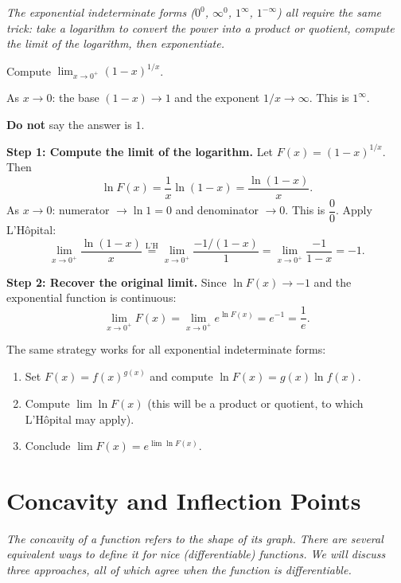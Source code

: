 \textit{The exponential indeterminate forms ($0^{0}$, $\infty^{0}$, $1^{\infty}$, $1^{-\infty}$) all require the same trick: take a logarithm to convert the power into a product or quotient, compute the limit of the logarithm, then exponentiate.}

\begin{example}
\label{ex:6-12}
Compute $\displaystyle\lim_{x \to 0^{+}} (1 - x)^{1/x}$.

As $x \to 0$: the base $(1-x) \to 1$ and the exponent $1/x \to \infty$.  This is $1^{\infty}$.

\textbf{Do not} say the answer is $1$.

\textbf{Step 1: Compute the limit of the logarithm.}  Let $F(x) = (1-x)^{1/x}$.  Then
\[
  \ln F(x) = \frac{1}{x}\ln(1-x) = \frac{\ln(1-x)}{x}.
\]
As $x \to 0$: numerator $\to \ln 1 = 0$ and denominator $\to 0$.  This is $\dfrac{0}{0}$.  Apply L'H\^opital:
\[
  \lim_{x \to 0^{+}}\frac{\ln(1-x)}{x} \stackrel{\text{L'H}}{=} \lim_{x \to 0^{+}}\frac{-1/(1-x)}{1} = \lim_{x \to 0^{+}}\frac{-1}{1-x} = -1.
\]

\textbf{Step 2: Recover the original limit.}  Since $\ln F(x) \to -1$ and the exponential function is continuous:
\[
  \lim_{x \to 0^{+}} F(x) = \lim_{x \to 0^{+}} e^{\ln F(x)} = e^{-1} = \frac{1}{e}.
\]
\end{example}

\begin{remark}
The same strategy works for all exponential indeterminate forms:
\begin{enumerate}[label=(\roman*)]
  \item Set $F(x) = f(x)^{g(x)}$ and compute $\ln F(x) = g(x)\ln f(x)$.
  \item Compute $\lim \ln F(x)$ (this will be a product or quotient, to which L'H\^opital may apply).
  \item Conclude $\lim F(x) = e^{\lim \ln F(x)}$.
\end{enumerate}
\end{remark}

\section{Concavity and Inflection Points}
\label{sec:6.13}

\textit{The concavity of a function refers to the shape of its graph.  There are several equivalent ways to define it for nice (differentiable) functions.  We will discuss three approaches, all of which agree when the function is differentiable.}

